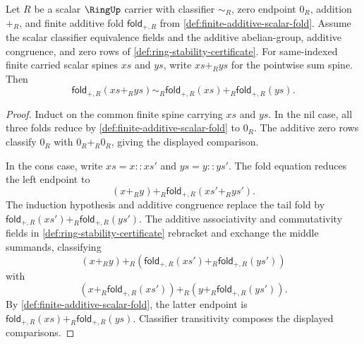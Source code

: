\begin{lemma}
\label{lem:finite-additive-fold-splits-pointwise-sums}
Let $R$ be a scalar $\RingUp$ carrier with classifier $\sim_R$, zero endpoint $0_R$, addition $+_R$, and finite additive fold $\mathsf{fold}_{+,R}$ from \autoref{def:finite-additive-scalar-fold}. Assume the scalar classifier equivalence fields and the additive abelian-group, additive congruence, and zero rows of \autoref{def:ring-stability-certificate}. For same-indexed finite carried scalar spines $xs$ and $ys$, write $xs+_R ys$ for the pointwise sum spine. Then
$$
\mathsf{fold}_{+,R}(xs+_R ys)
\sim_R
\mathsf{fold}_{+,R}(xs)+_R\mathsf{fold}_{+,R}(ys).
$$
\end{lemma}
\begin{proof}
Induct on the common finite spine carrying $xs$ and $ys$. In the nil case, all three folds reduce by \autoref{def:finite-additive-scalar-fold} to $0_R$. The additive zero rows classify $0_R$ with $0_R+_R0_R$, giving the displayed comparison.

In the cons case, write $xs=x::xs'$ and $ys=y::ys'$. The fold equation reduces the left endpoint to
$$
(x+_Ry)+_R\mathsf{fold}_{+,R}(xs'+_Rys').
$$
The induction hypothesis and additive congruence replace the tail fold by $\mathsf{fold}_{+,R}(xs')+_R\mathsf{fold}_{+,R}(ys')$. The additive associativity and commutativity fields in \autoref{def:ring-stability-certificate} rebracket and exchange the middle summands, classifying
$$
(x+_Ry)+_R(\mathsf{fold}_{+,R}(xs')+_R\mathsf{fold}_{+,R}(ys'))
$$
with
$$
(x+_R\mathsf{fold}_{+,R}(xs'))+_R(y+_R\mathsf{fold}_{+,R}(ys')).
$$
By \autoref{def:finite-additive-scalar-fold}, the latter endpoint is $\mathsf{fold}_{+,R}(xs)+_R\mathsf{fold}_{+,R}(ys)$. Classifier transitivity composes the displayed comparisons.
\end{proof}

